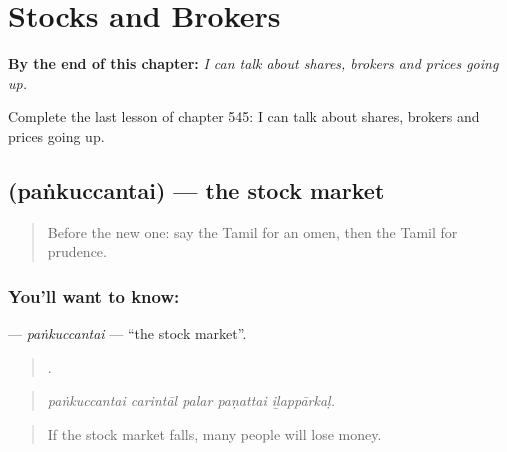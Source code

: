 
\chapter{Stocks and Brokers}
\label{ch:ta-stocks-and-brokers}

\begin{chapteropening}
\textbf{By the end of this chapter:} \emph{I can talk about shares, brokers and prices going up.}

Complete the last lesson of chapter 545: I can talk about shares, brokers and prices going up.
\end{chapteropening}

\section[\texorpdfstring{\ta{பங்குச்சந்தை} (paṅkuccantai)}{பங்குச்சந்தை (paṅkuccantai)}]{ (paṅkuccantai) — the stock market}

\label{lesson:TA-C545-pankuccantai}



\begin{quote}
Before the new one: say the Tamil for an omen, then the Tamil for prudence.
\end{quote}

\subsection*{You'll want to know: }
\textbf{} — \emph{paṅkuccantai} — \textquotedblleft{}the stock market\textquotedblright{}.

\begin{quote}
    .
\end{quote}

\begin{quote}
\emph{paṅkuccantai carintāl palar paṇattai iḻappārkaḷ.}
\end{quote}

\begin{quote}
If the stock market falls, many people will lose money.
\end{quote}

